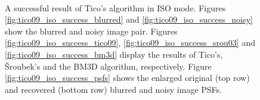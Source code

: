 \documentclass[12pt,notitlepage]{report}
\begin{document}
\begin{figure}[t]
	  ~
	  ~
  \caption[A successful result of Tico's algorithm in ISO mode]{A successful result of Tico's algorithm in ISO mode. Figures \ref{fig:tico09_iso_success_blurred} and \ref{fig:tico09_iso_success_noisy} show the blurred and noisy image pair. Figures \ref{fig:tico09_iso_success_tico09}, \ref{fig:tico09_iso_success_srou03} and \ref{fig:tico09_iso_success_bm3d} display the results of Tico's, Šroubek's and the BM3D algorithm, respectively. Figure \ref{fig:tico09_iso_success_psfs} shows the enlarged original (top row) and recovered (bottom row) blurred and noisy image PSFs.}
  \label{fig:tico09_iso_success}
\end{figure}
\end{document}
